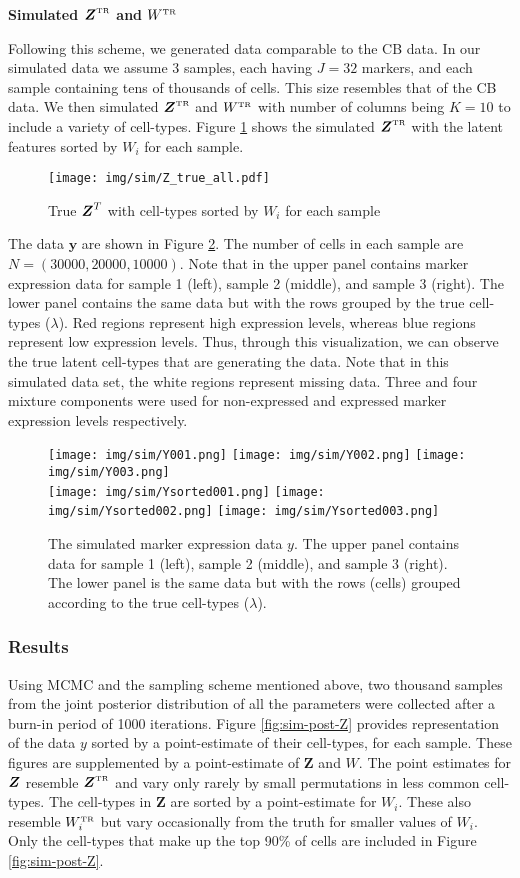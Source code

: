 \documentclass[12pt,]{article}
\def\beginmyfig{\begin{figure}[H]\center}
\def\endmyfig{\end{figure}}
\def\y{\bm{y}}
\def\Z{\bm{Z}}
\newcommand{\true}{{\mbox{\tiny TR}}}
\newcommand{\bZ}{\mbox{\boldmath $Z$}}
\def\beginmyfig{\begin{figure}[H]\center}
\def\endmyfig{\end{figure}}
\begin{document}
\textbf{Simulated $\bZ^\true$ and $W^\true$}

Following this scheme, we generated data comparable to the CB data.  In our
simulated data we assume 3 samples, each having $J=32$ markers, and each sample
containing tens of thousands of cells. This size resembles that of the CB data.
We then simulated $\bZ^\true$ and $W^\true$ with number of columns being $K=10$
to include a variety of cell-types. Figure \ref{fig:sim-Z} shows the simulated
$\bZ^\true$ with the latent features sorted by $W_i$ for each sample. 

\beginmyfig
\texttt{[image: img/sim/Z\_true\_all.pdf]}
\caption{True $\bZ^T$ with cell-types sorted by $W_i$ for each sample}
\label{fig:sim-Z}
\endmyfig

The data $\y$ are shown in Figure \ref{fig:sim-Y}. The number of cells in each
sample are $N=(30000, 20000, 10000)$. Note that in the upper panel contains
marker expression data for sample 1 (left), sample 2 (middle), and sample 3
(right). The lower panel contains the same data but with the rows grouped by
the true cell-types ($\lambda$).  Red regions represent high expression levels,
whereas blue regions represent low expression levels. Thus, through this
visualization, we can observe the true latent cell-types that are generating
the data. Note that in this simulated data set, the white regions represent
missing data.  Three and four mixture components were used for non-expressed
and expressed marker expression levels respectively. 

\beginmyfig
\texttt{[image: img/sim/Y001.png]}
\texttt{[image: img/sim/Y002.png]}
\texttt{[image: img/sim/Y003.png]} \\
\texttt{[image: img/sim/Ysorted001.png]}
\texttt{[image: img/sim/Ysorted002.png]}
\texttt{[image: img/sim/Ysorted003.png]} 
\caption{The simulated marker expression data $y$. The upper panel contains
data for sample 1 (left), sample 2 (middle), and sample 3 (right). The lower
panel is the same data but with the rows (cells) grouped according to the true
cell-types ($\lambda$).}
\label{fig:sim-Y}
\endmyfig

\subsubsection{Results}

Using MCMC and the sampling scheme mentioned above, two thousand samples from
the joint posterior distribution of all the parameters were collected after a
burn-in period of 1000 iterations. Figure \ref{fig:sim-post-Z} provides
representation of the data $y$ sorted by a point-estimate of their cell-types,
for each sample.  These figures are supplemented by a point-estimate of $\Z$
and $W$. The point estimates for $\bZ$ resemble $\bZ^\true$ and vary only rarely by
small permutations in less common cell-types. The cell-types in $\Z$ are sorted
by a point-estimate for $W_i$.  These also resemble $W_i^\true$ but vary
occasionally from the truth for smaller values of $W_i$. Only the cell-types
that make up the top 90\% of cells are included in Figure \ref{fig:sim-post-Z}.
\end{document}
